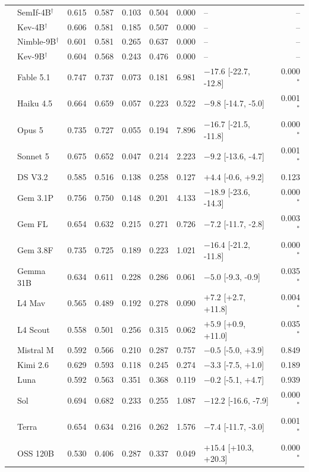 \begin{longtable}{llrrrrrlr}
 & SemIf-4B$^{\dagger}$ & 0.615 & 0.587 & 0.103 & 0.504 & 0.000 & -- & -- \\
 & Kev-4B$^{\dagger}$ & 0.606 & 0.581 & 0.185 & 0.507 & 0.000 & -- & -- \\
 & Nimble-9B$^{\dagger}$ & 0.601 & 0.581 & 0.265 & 0.637 & 0.000 & -- & -- \\
 & Kev-9B$^{\dagger}$ & 0.604 & 0.568 & 0.243 & 0.476 & 0.000 & -- & -- \\
 & Fable 5.1 & 0.747 & 0.737 & 0.073 & 0.181 & 6.981 & $-17.6$ [-22.7, -12.8] & 0.000$^{*}$ \\
 & Haiku 4.5 & 0.664 & 0.659 & 0.057 & 0.223 & 0.522 & $-9.8$ [-14.7, -5.0] & 0.001$^{*}$ \\
 & Opus 5 & 0.735 & 0.727 & 0.055 & 0.194 & 7.896 & $-16.7$ [-21.5, -11.8] & 0.000$^{*}$ \\
 & Sonnet 5 & 0.675 & 0.652 & 0.047 & 0.214 & 2.223 & $-9.2$ [-13.6, -4.7] & 0.001$^{*}$ \\
 & DS V3.2 & 0.585 & 0.516 & 0.138 & 0.258 & 0.127 & $+4.4$ [-0.6, +9.2] & 0.123 \\
 & Gem 3.1P & 0.756 & 0.750 & 0.148 & 0.201 & 4.133 & $-18.9$ [-23.6, -14.3] & 0.000$^{*}$ \\
 & Gem FL & 0.654 & 0.632 & 0.215 & 0.271 & 0.726 & $-7.2$ [-11.7, -2.8] & 0.003$^{*}$ \\
 & Gem 3.8F & 0.735 & 0.725 & 0.189 & 0.223 & 1.021 & $-16.4$ [-21.2, -11.8] & 0.000$^{*}$ \\
 & Gemma 31B & 0.634 & 0.611 & 0.228 & 0.286 & 0.061 & $-5.0$ [-9.3, -0.9] & 0.035$^{*}$ \\
 & L4 Mav & 0.565 & 0.489 & 0.192 & 0.278 & 0.090 & $+7.2$ [+2.7, +11.8] & 0.004$^{*}$ \\
 & L4 Scout & 0.558 & 0.501 & 0.256 & 0.315 & 0.062 & $+5.9$ [+0.9, +11.0] & 0.035$^{*}$ \\
 & Mistral M & 0.592 & 0.566 & 0.210 & 0.287 & 0.757 & $-0.5$ [-5.0, +3.9] & 0.849 \\
 & Kimi 2.6 & 0.629 & 0.593 & 0.118 & 0.245 & 0.274 & $-3.3$ [-7.5, +1.0] & 0.189 \\
 & Luna & 0.592 & 0.563 & 0.351 & 0.368 & 0.119 & $-0.2$ [-5.1, +4.7] & 0.939 \\
 & Sol & 0.694 & 0.682 & 0.233 & 0.255 & 1.087 & $-12.2$ [-16.6, -7.9] & 0.000$^{*}$ \\
 & Terra & 0.654 & 0.634 & 0.216 & 0.262 & 1.576 & $-7.4$ [-11.7, -3.0] & 0.001$^{*}$ \\
 & OSS 120B & 0.530 & 0.406 & 0.287 & 0.337 & 0.049 & $+15.4$ [+10.3, +20.3] & 0.000$^{*}$ \\

\end{longtable}
